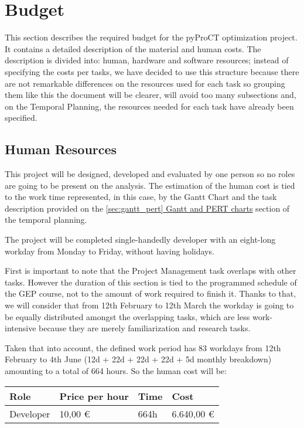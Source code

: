 \chapter{Budget}

This section describes the required budget for the pyProCT optimization project. It contains a detailed description of the material and human costs. The description is divided into: human, hardware and software resources; instead of specifying the costs per tasks, we have decided to use this structure because there are not remarkable differences on the resources used for each task so grouping them like this the document will be clearer, will avoid too many subsections and, on the Temporal Planning, the resources needed for each task have already been specified.

\section{Human Resources}


This project will be designed, developed and evaluated by one person so no roles are going to be present on the analysis. The estimation of the human cost is tied to the work time represented, in this case, by the Gantt Chart and the task description provided on the \hyperref[sec:gantt_pert]{\ref*{sec:gantt_pert} Gantt and PERT charts} section of the temporal planning. 

The project will be completed single-handedly developer with an eight-long workday from Monday to Friday, without having holidays.

First is important to note that the Project Management task overlaps with other tasks. However the duration of this section is tied to the programmed schedule of the GEP course, not to the amount of work required to finish it. Thanks to that, we will consider that from 12th February to 12th March the workday is going to be equally distributed amongst the overlapping tasks, which are less work-intensive because they are merely familiarization and research tasks.

Taken that into account, the defined work period has 83 workdays from 12th February to 4th June (12d + 22d + 22d + 22d + 5d monthly breakdown) amounting to a total of 664 hours. So the human cost will be:
\\

\begin{center}
	\begin{tabular}{| R{3cm} | C{3cm} | C{3cm} | C{3cm} |}
	\hline
	Role & Price per hour & Time & Cost \\ 
	\hline
	\hline
	Developer & 10,00 \euro & 664h & 6.640,00 \euro \\
	\hline
	\end{tabular}
\end{center}


